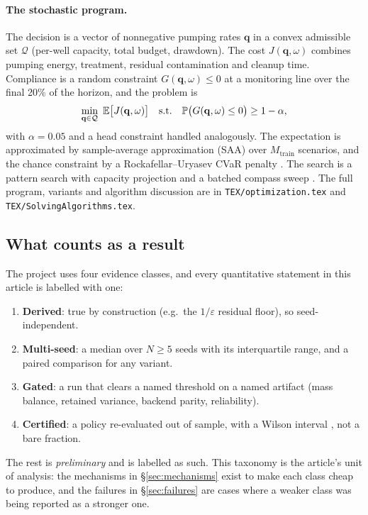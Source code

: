 \paragraph{The stochastic program.} The decision is a vector of nonnegative
pumping rates $\mathbf{q}$ in a convex admissible set $\mathcal{Q}$ (per-well
capacity, total budget, drawdown). The cost $J(\mathbf{q},\omega)$ combines
pumping energy, treatment, residual contamination and cleanup time. Compliance
is a random constraint $G(\mathbf{q},\omega)\le0$ at a monitoring line over the
final 20\% of the horizon, and the problem is
\begin{equation}
\min_{\mathbf{q}\in\mathcal{Q}}\ \E\bigl[J(\mathbf{q},\omega)\bigr]
\quad\text{s.t.}\quad
\Prob\bigl(G(\mathbf{q},\omega)\le0\bigr)\ge1-\alpha,
\label{eq:chance}
\end{equation}
with $\alpha=0.05$ and a head constraint handled analogously. The expectation
is approximated by sample-average approximation (SAA) over $M_{\text{train}}$
scenarios, and the chance constraint by a Rockafellar--Uryasev CVaR penalty
\citep{rockafellar2000optimization,shapiro2009lectures}. The search is a pattern
search with capacity projection and a batched compass sweep
\citep{audet2006mesh}. The full program, variants and algorithm discussion are
in \texttt{TEX/optimization.tex} and \texttt{TEX/SolvingAlgorithms.tex}.

\subsection{What counts as a result}
\label{sec:case-result}

The project uses four evidence classes, and every quantitative statement in
this article is labelled with one:
\begin{enumerate}
  \item \textbf{Derived}: true by construction (e.g.\ the $1/\varepsilon$
        residual floor), so seed-independent.
  \item \textbf{Multi-seed}: a median over $N\ge5$ seeds with its interquartile
        range, and a paired comparison for any variant.
  \item \textbf{Gated}: a run that clears a named threshold on a named artifact
        (mass balance, retained variance, backend parity, reliability).
  \item \textbf{Certified}: a policy re-evaluated out of sample, with a Wilson
        interval \citep{wilson1927probable}, not a bare fraction.
\end{enumerate}
The rest is \emph{preliminary} and is labelled as such. This taxonomy is the
article's unit of analysis: the mechanisms in \S\ref{sec:mechanisms} exist to
make each class cheap to produce, and the failures in \S\ref{sec:failures} are
cases where a weaker class was being reported as a stronger one.

